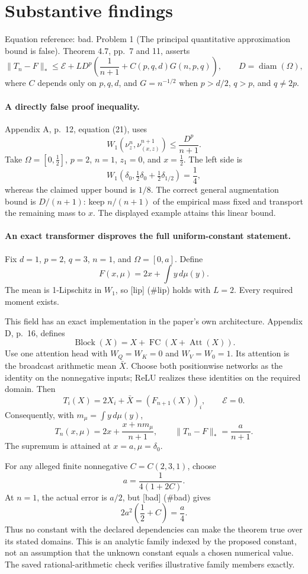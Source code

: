 \documentclass[10pt]{article}
\begin{document}
\section*{Substantive findings}
Equation reference: bad. Problem 1 (The principal quantitative approximation bound is false).  Theorem 4.7, pp. 7 and 11, asserts \[
 \|T_n-F\|_*\le\mathcal E+
 L D^p\left(\frac1{n+1}+C(p,q,d)G(n,p,q)\right),
 \qquad D=\operatorname{diam}(\Omega),\] where \(C\) depends only on \(p,q,d\), and \(G=n^{-1/2}\) when \(p>d/2\), \(q>p\), and \(q\ne2p\).\par
\paragraph*{A directly false proof inequality.}\mbox{}\par
Appendix A, p. 12, equation (21), uses \[W_1(\nu_z^n,\nu_{(x,z)}^{n+1})\le\frac{D^p}{n+1}.\] Take \(\Omega=[0,\tfrac12]\), \(p=2\), \(n=1\), \(z_1=0\), and \(x=\tfrac12\). The left side is \[W_1\left(\delta_0,\tfrac12\delta_0+\tfrac12\delta_{1/2}\right)
 =\frac14,\] whereas the claimed upper bound is \(1/8\). The correct general augmentation bound is \(D/(n+1)\): keep \(n/(n+1)\) of the empirical mass fixed and transport the remaining mass to \(x\). The displayed example attains this linear bound.\par
\paragraph*{An exact transformer disproves the full uniform-constant statement.}\mbox{}\par
Fix \(d=1\), \(p=2\), \(q=3\), \(n=1\), and \(\Omega=[0,a]\). Define \[F(x,\mu)=2x+\int y\,d\mu(y).\] The mean is 1-Lipschitz in \(W_1\), so [lip] (\#lip) holds with \(L=2\). Every required moment exists.\par
This field has an exact implementation in the paper’s own architecture. Appendix D, p. 16, defines \[\operatorname{Block}(X)=X+\operatorname{FC}(X+\operatorname{Att}(X)).\] Use one attention head with \(W_Q=W_K=0\) and \(W_V=W_0=1\). Its attention is the broadcast arithmetic mean \(\bar X\). Choose both positionwise networks as the identity on the nonnegative inputs; ReLU realizes these identities on the required domain. Then \[T_i(X)=2X_i+\bar X=(F_{n+1}(X))_i,
 \qquad \mathcal E=0.\] Consequently, with \(m_\mu=\int y\,d\mu(y)\), \[T_n(x,\mu)=2x+\frac{x+n m_\mu}{n+1},\qquad
 \|T_n-F\|_*=\frac{a}{n+1}.\] The supremum is attained at \(x=a,\mu=\delta_0\).\par
For any alleged finite nonnegative \(C=C(2,3,1)\), choose \[a=\frac1{4(1+2C)}.\] At \(n=1\), the actual error is \(a/2\), but [bad] (\#bad) gives \[2a^2\left(\frac12+C\right)=\frac a4.\] Thus no constant with the declared dependencies can make the theorem true over its stated domains. This is an analytic family indexed by the proposed constant, not an assumption that the unknown constant equals a chosen numerical value. The saved rational-arithmetic check verifies illustrative family members exactly.\par
\end{document}
